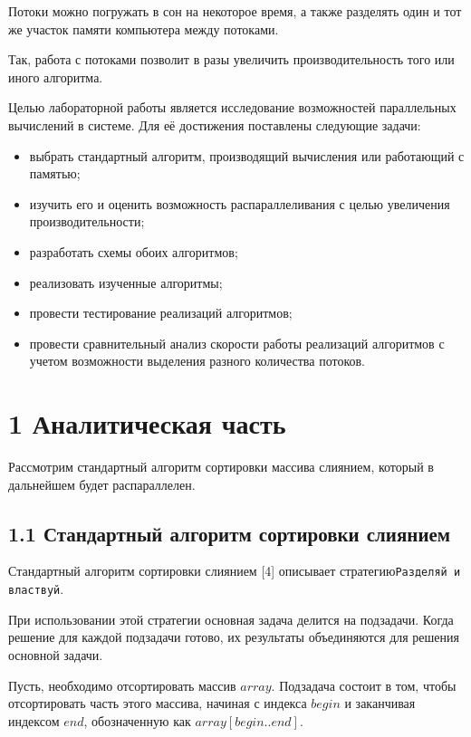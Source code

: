 \documentclass[12pt, a4paper]{report}
\begin{document}
Потоки можно погружать в сон на некоторое время, а также разделять один и тот же участок памяти компьютера между потоками.

Так, работа с потоками позволит в разы увеличить производительность того или иного алгоритма.

Целью лабораторной работы является исследование возможностей параллельных вычислений в системе. Для её достижения поставлены следующие задачи:

\begin{itemize}
	\item выбрать стандартный алгоритм, производящий вычисления или работающий с памятью;
	\item изучить его и оценить возможность распараллеливания с целью увеличения производительности;
	\item разработать схемы обоих алгоритмов;
	\item реализовать изученные алгоритмы;
	\item провести тестирование реализаций алгоритмов;
	\item провести сравнительный анализ скорости работы реализаций алгоритмов с учетом возможности выделения разного количества потоков.
\end{itemize}

\newpage
\chapter*{1 Аналитическая часть}

Рассмотрим стандартный алгоритм сортировки массива слиянием, который в дальнейшем будет распараллелен.

\section*{1.1 Стандартный алгоритм сортировки слиянием}

Стандартный алгоритм сортировки слиянием [4] описывает стратегию\newline \verb|Разделяй и властвуй|.

При использовании этой стратегии основная задача делится на подзадачи. Когда решение для каждой подзадачи готово, их результаты объединяются для решения основной задачи.

Пусть, необходимо отсортировать массив $array$. Подзадача состоит в том, чтобы отсортировать часть этого массива, начиная с индекса $begin$ и заканчивая индексом $end$, обозначенную как $array[begin..end]$.\newline
\end{document}
